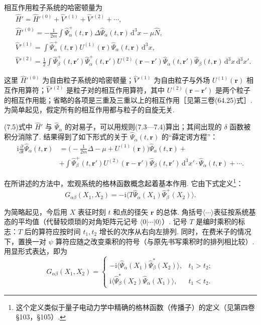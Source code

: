 相互作用粒子系统的哈密顿量为
\begin{equation}
\begin{aligned}
&\hat H'=\hat H'^{(0)}+\hat V'^{(1)}+\hat V'^{(2)}+\cdots,\\
&\hat H'^{(0)}=-\frac{1}{2m}\int\hat\Psi^{+}_\alpha(t,\bm r)\Delta\hat\Psi_\alpha(t,\bm r)\,\mathrm{d}^3x-\mu\hat N,\\
&\hat V'^{(1)}=\int\hat\Psi^{+}_\alpha(t,\bm r)U^{(1)}(\bm r)\hat\Psi_\alpha(t,\bm r)\,\mathrm{d}^3x,\\
&\hat V'^{(2)}=\frac{1}{2}\int\hat\Psi^{+}_\beta(t,\bm r')\hat\Psi^{+}_\alpha(t,\bm r')U^{(2)}(\bm r-\bm r')\hat\Psi_\alpha(t,\bm r')\hat\Psi_\beta(t,\bm r)\,\mathrm{d}^3x\,\mathrm{d}^3x'.
\end{aligned}
\end{equation}

这里 $\hat H'^{(0)}$ 为自由粒子系统的哈密顿量；$\hat V'^{(1)}$ 为自由粒子与外场 $U^{(1)}(\bm r)$ 相互作用算符；$\hat V'^{(2)}$ 是粒子对的相互作用算符，其中 $U^{(2)}(\bm r-\bm r')$ 是两个粒子的相互作用能；省略的各项是三重及三重以上的相互作用［见第三卷(64.25)式］. 为简单起见，假定所有的相互作用都与粒子的自旋无关.

(7.5)式中 $\hat H'$ 与 $\hat\Psi_\alpha$ 的对易子，可以用规则(7.3—7.4)算出；其间出现的 $\delta$ 函数被积分消除了. 结果得到了如下形式的关于 $\hat\Psi_\alpha(t,\bm r)$ 的“薛定谔方程”：
\begin{equation}
\begin{aligned}
\mathrm{i}\frac{\partial}{\partial t}\hat\Psi_\alpha(t,\bm r)&=\Big(-\frac{1}{2m}\Delta-\mu+U^{(1)}(\bm r)\Big)\hat\Psi_\alpha(t,\bm r)+\\
&+\int\hat\Psi^{+}_\beta(t,\bm r')U^{(2)}(\bm r-\bm r')\hat\Psi_\beta(t,\bm r')\,\mathrm{d}^3x'\cdot\hat\Psi_\alpha(t,\bm r)+\cdots.
\end{aligned}
\end{equation}

在所讲述的方法中，宏观系统的格林函数概念起着基本作用. 它由下式定义\footnote{这个定义类似于量子电动力学中精确的格林函数（传播子）的定义（见第四卷 §103，§105）.}：
\begin{equation}
G_{\alpha\beta}(X_1,X_2)=-\mathrm{i}\langle T\hat\Psi_\alpha(X_1)\hat\Psi^{+}_\beta(X_2)\rangle.
\end{equation}

为简略起见，今后用 $X$ 表征时刻 $t$ 和点的径矢 $\bm r$ 的总体. 角括号$\langle\cdots\rangle$表征按系统基态的平均值（代替较烦琐的对角矩阵元记号 $\langle0|\cdots|0\rangle$）. 记号 $T$ 是编时乘积的标志：$T$ 后的算符应按时间 $t_1,t_2$ 增长的次序从右向左排列. 同时，在费米子的情况下，置换一对 $\psi$ 算符应随之改变乘积的符号（与原先书写乘积时的排列相比较）. 用显形式表达，即为
\begin{equation}
G_{\alpha\beta}(X_1,X_2)=
\begin{cases}
-\mathrm{i}\langle\hat\Psi_\alpha(X_1)\hat\Psi^{*}_\beta(X_2)\rangle,& t_1>t_2;\\
\mathrm{i}\langle\hat\Psi^{*}_\beta(X_2)\hat\Psi_\alpha(X_1)\rangle,& t_1<t_2.
\end{cases}
\end{equation}

